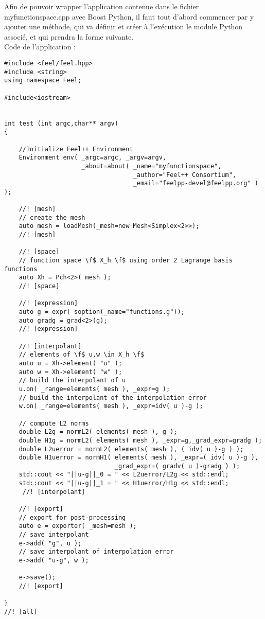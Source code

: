 \documentclass[12pt]{article}
\begin{document}
Afin de pouvoir wrapper l'application contenue dans le fichier myfunctionspace.cpp avec Boost Python, il faut tout d'abord commencer par y ajouter une méthode, qui va définir et créer à l'exécution le module Python associé, et qui prendra la forme suivante.\\

Code de l'application :
\begin{lstlisting}
#include <feel/feel.hpp>
#include <string>
using namespace Feel;

#include<iostream>


int test (int argc,char** argv)
{

    //Initialize Feel++ Environment
    Environment env( _argc=argc, _argv=argv,
                     _about=about( _name="myfunctionspace",
                                   _author="Feel++ Consortium",
                                   _email="feelpp-devel@feelpp.org" )  );

    //! [mesh]
    // create the mesh
    auto mesh = loadMesh(_mesh=new Mesh<Simplex<2>>);
    //! [mesh]

    //! [space]
    // function space \f$ X_h \f$ using order 2 Lagrange basis functions
    auto Xh = Pch<2>( mesh );
    //! [space]

    //! [expression]
    auto g = expr( soption(_name="functions.g"));
    auto gradg = grad<2>(g);
    //! [expression]

    //! [interpolant]
    // elements of \f$ u,w \in X_h \f$
    auto u = Xh->element( "u" );
    auto w = Xh->element( "w" );
    // build the interpolant of u
    u.on( _range=elements( mesh ), _expr=g );
    // build the interpolant of the interpolation error
    w.on( _range=elements( mesh ), _expr=idv( u )-g );

    // compute L2 norms
    double L2g = normL2( elements( mesh ), g );
    double H1g = normL2( elements( mesh ), _expr=g,_grad_expr=gradg );
    double L2uerror = normL2( elements( mesh ), ( idv( u )-g ) );
    double H1uerror = normH1( elements( mesh ), _expr=( idv( u )-g ),
                              _grad_expr=( gradv( u )-gradg ) );
    std::cout << "||u-g||_0 = " << L2uerror/L2g << std::endl;
    std::cout << "||u-g||_1 = " << H1uerror/H1g << std::endl;
     //! [interpolant]

    //! [export]
    // export for post-processing
    auto e = exporter( _mesh=mesh );
    // save interpolant
    e->add( "g", u );
    // save interpolant of interpolation error
    e->add( "u-g", w );

    e->save();
    //! [export]
  
}
//! [all]
\end{lstlisting}
\end{document}
